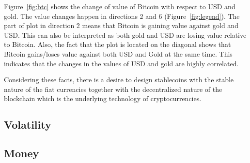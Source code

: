 Figure~\ref{fig:btc} shows the change of value of Bitcoin with respect to USD and gold. The value changes happen in directions 2 and 6 (Figure~\ref{fig:legend}). The part of plot in direction 2 means that Bitcoin is gaining value against gold and USD. This can also be interpreted as both gold and USD are losing value relative to Bitcoin. %
Also, the fact that the plot is located on the diagonal shows that Bitcoin gains/loses value against both USD and Gold at the same time. This indicates that the changes in the values of USD and gold are highly correlated.

Considering these facts, there is a desire to design stablecoins with the stable nature of the fiat currencies together with the decentralized nature of the blockchain which is the underlying technology of cryptocurrencies.

\subsection{Volatility}


%


\subsection{Money}

